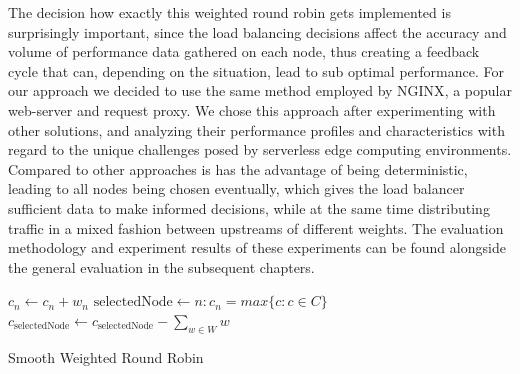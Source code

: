 \documentclass[draft,final]{vutinfth} %
\begin{document}
The decision how exactly this weighted round robin gets implemented is surprisingly important, since the load balancing decisions affect the accuracy and volume of performance data gathered on each node, thus creating a feedback cycle that can, depending on the situation, lead to sub optimal performance.
For our approach we decided to use the same method employed by NGINX\cite{nginx}, a popular web-server and request proxy.
We chose this approach after experimenting with other solutions, and analyzing their performance profiles and characteristics with regard to the unique challenges posed by serverless edge computing environments.
Compared to other approaches is has the advantage of being deterministic, leading to all nodes being chosen eventually, which gives the load balancer sufficient data to make informed decisions, while at the same time distributing traffic in a mixed fashion between upstreams of different weights.
The evaluation methodology and experiment results of these experiments can be found alongside the general evaluation in the subsequent chapters.

\begin{algorithm}
    {
        $c_{n} \leftarrow c_{n} + w_{n}$ 
    }
    $\text{selectedNode} \leftarrow n: c_{n} = max\{c: c \in C\}$ \\
    $c_{\text{selectedNode}} \leftarrow c_{\text{selectedNode}} - \sum_{w \in W}w$\\


  \caption{Smooth Weighted Round Robin}
  \label{alg:smooth-wrr}
\end{algorithm}
\end{document}
